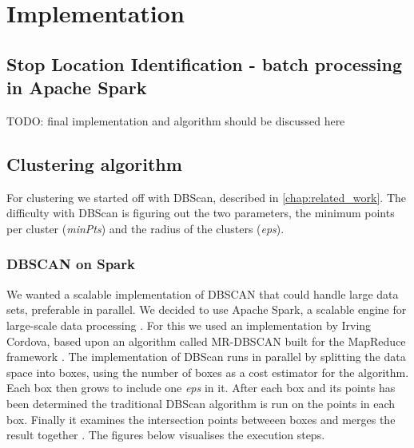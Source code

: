 \chapter{Implementation}
\label{cha:implementation}


\section{Stop Location Identification - batch processing in Apache Spark}

TODO: final implementation and algorithm should be discussed here

\section{Clustering algorithm}

For clustering we started off with DBScan, described in \autoref{chap:related_work}. The difficulty with DBScan is figuring out the two parameters, the minimum points per cluster (\textit{minPts}) and the radius of the clusters (\textit{eps}). 

\subsection{DBSCAN on Spark}

We wanted a scalable implementation of DBSCAN that could handle large data sets, preferable in parallel. We decided to use Apache Spark, a scalable engine for large-scale data processing \cite{spark}. For this we used an implementation by Irving Cordova, based upon an algorithm called MR-DBSCAN built for the MapReduce framework \cite{dbscan_on_spark}. The implementation of DBScan runs in parallel by splitting the data space into boxes, using the number of boxes as a cost estimator for the algorithm. Each box then grows to include one \textit{eps} in it. After each box and its points has been determined the traditional DBScan algorithm is run on the points in each box. Finally it examines the intersection points betweeen boxes and merges the result together \cite{vis_dbscan_on_spark}. The figures below visualises the execution steps.

